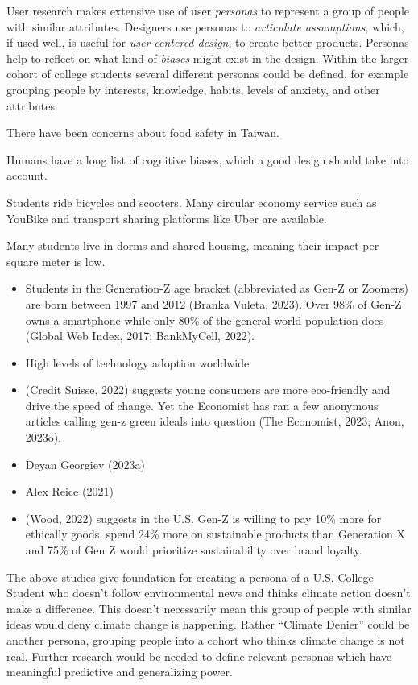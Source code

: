 \documentclass[
  letterpaper,
  DIV=11,
  numbers=noendperiod]{scrartcl}
\begin{document}
User research makes extensive use of user \emph{personas} to represent a
group of people with similar attributes. Designers use personas to
\emph{articulate assumptions,} which, if used well, is useful for
\emph{user-centered design}, to create better products. Personas help to
reflect on what kind of \emph{biases} might exist in the design. Within
the larger cohort of college students several different personas could
be defined, for example grouping people by interests, knowledge, habits,
levels of anxiety, and other attributes.

There have been concerns about food safety in Taiwan.

Humans have a long list of cognitive biases, which a good design should
take into account.

Students ride bicycles and scooters. Many circular economy service such
as YouBike and transport sharing platforms like Uber are available.

Many students live in dorms and shared housing, meaning their impact per
square meter is low.

\begin{itemize}
\item
  Students in the Generation-Z age bracket (abbreviated as Gen-Z or
  Zoomers) are born between 1997 and 2012 (Branka Vuleta, 2023). Over
  98\% of Gen-Z owns a smartphone while only 80\% of the general world
  population does (Global Web Index, 2017; BankMyCell, 2022).
\item
  High levels of technology adoption worldwide
\item
  (Credit Suisse, 2022) suggests young consumers are more eco-friendly
  and drive the speed of change. Yet the Economist has ran a few
  anonymous articles calling gen-z green ideals into question (The
  Economist, 2023; Anon, 2023o).
\item
  Deyan Georgiev (2023a)
\item
  Alex Reice (2021)
\item
  (Wood, 2022) suggests in the U.S. Gen-Z is willing to pay 10\% more
  for ethically goods, spend 24\% more on sustainable products than
  Generation X and 75\% of Gen Z would prioritize sustainability over
  brand loyalty.
\end{itemize}

The above studies give foundation for creating a persona of a U.S.
College Student who doesn't follow environmental news and thinks climate
action doesn't make a difference. This doesn't necessarily mean this
group of people with similar ideas would deny climate change is
happening. Rather ``Climate Denier'' could be another persona, grouping
people into a cohort who thinks climate change is not real. Further
research would be needed to define relevant personas which have
meaningful predictive and generalizing power.
\end{document}
